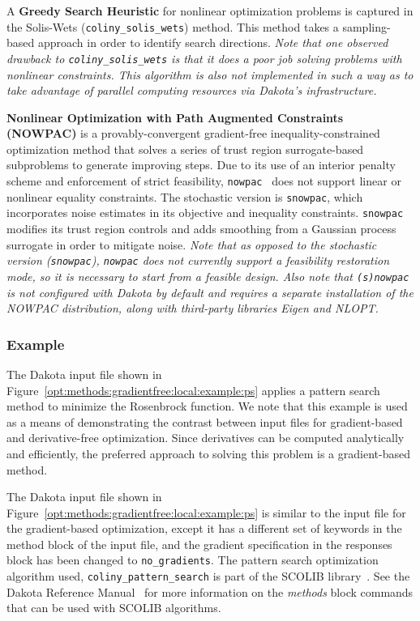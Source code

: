 A {\bf Greedy Search Heuristic} for nonlinear optimization problems is
captured in the Solis-Wets (\texttt{coliny\_solis\_wets}) method.
This method takes a sampling-based approach in order to identify
search directions.  \emph{Note that one observed drawback to
  \texttt{coliny\_solis\_wets} is that it does a poor job solving
  problems with nonlinear constraints.  This algorithm is also not
  implemented in such a way as to take advantage of parallel computing
  resources via Dakota's infrastructure.}

{\bf Nonlinear Optimization with Path Augmented Constraints (NOWPAC)} is a provably-convergent gradient-free inequality-constrained optimization method that solves a series of trust region surrogate-based subproblems to generate improving steps. Due to its use of an interior penalty scheme and enforcement of strict feasibility, \texttt{nowpac}~\cite{Augustin-preprint-nowpac} does not support linear or nonlinear equality constraints. The stochastic version is \texttt{snowpac}, which incorporates noise estimates in its objective and inequality constraints. \texttt{snowpac} modifies its trust region controls and adds smoothing from a Gaussian process surrogate in order to mitigate noise. \emph{Note that as opposed to the stochastic version (\texttt{snowpac}), \texttt{nowpac} does not currently support a feasibility restoration mode, so it is necessary to start from a feasible design. Also note that \texttt{(s)nowpac} is not configured with Dakota by default and requires a separate installation of the NOWPAC distribution, along with third-party libraries Eigen and NLOPT.}

\subsubsection{Example}
\label{opt:methods:gradientfree:local:example}

The Dakota input file shown in
Figure~\ref{opt:methods:gradientfree:local:example:ps} applies a
pattern search method to minimize the Rosenbrock function. We note
that this example is used as a means of demonstrating the contrast
between input files for gradient-based and derivative-free
optimization.  Since derivatives can be computed analytically and
efficiently, the preferred approach to solving this problem is a
gradient-based method.

The Dakota input file shown in
Figure~\ref{opt:methods:gradientfree:local:example:ps} is similar to
the input file for the gradient-based optimization, except it has a
different set of keywords in the method block of the input file, and
the gradient specification in the responses block has been changed to
\texttt{no\_gradients}. The pattern search optimization algorithm
used, \texttt{coliny\_pattern\_search} is part of the SCOLIB
library~\cite{Har06}. See the Dakota Reference Manual~\cite{RefMan}
for more information on the \emph{methods} block commands that can be
used with SCOLIB algorithms.


